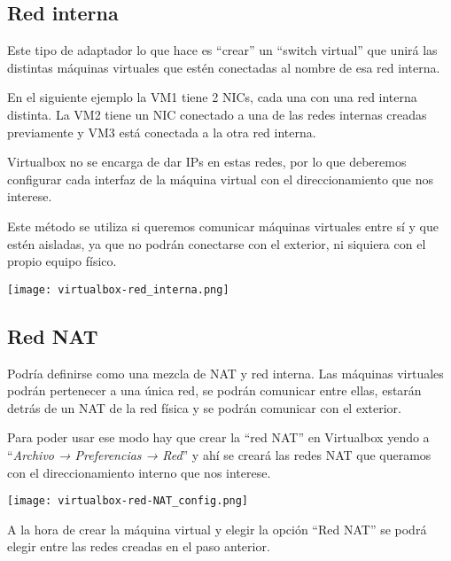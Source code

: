 \subsection{Red interna}
Este tipo de adaptador lo que hace es “crear” un “switch virtual” que unirá las distintas máquinas virtuales que estén conectadas al nombre de esa red interna.

En el siguiente ejemplo la VM1 tiene 2 NICs, cada una con una red interna distinta. La VM2 tiene un NIC conectado a una de las redes internas creadas previamente y VM3 está conectada a la otra red interna.

Virtualbox no se encarga de dar IPs en estas redes, por lo que deberemos configurar cada interfaz de la máquina virtual con el direccionamiento que nos interese.

Este método se utiliza si queremos comunicar máquinas virtuales entre sí y que estén aisladas, ya que no podrán conectarse con el exterior, ni siquiera con el propio equipo físico.

\begin{center}
    \vspace{-10pt}
    \texttt{[image: virtualbox-red\_interna.png]}
    \vspace{-10pt}
    \vspace{-20pt}
\end{center}

\subsection{Red NAT}
Podría definirse como una mezcla de NAT y red interna. Las máquinas virtuales podrán pertenecer a una única red, se podrán comunicar entre ellas, estarán detrás de un NAT de la red física y se podrán comunicar con el exterior.

Para poder usar ese modo hay que crear la “red NAT” en Virtualbox yendo a “\textit{Archivo → Preferencias → Red}” y ahí se creará las redes NAT que queramos con el direccionamiento interno que nos interese.

\begin{center}
    \vspace{-10pt}
    \texttt{[image: virtualbox-red-NAT\_config.png]}
    \vspace{-20pt}
\end{center}

A la hora de crear la máquina virtual y elegir la opción “Red NAT” se podrá elegir entre las redes creadas en el paso anterior.

